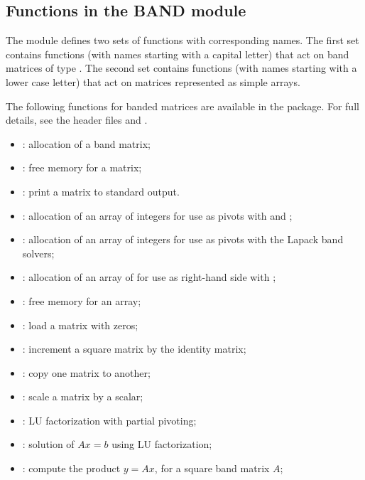 \subsection{Functions in the BAND module}\label{ss:band}

The {\band} module defines two sets of functions with corresponding names.
The first set contains functions (with names starting with a capital letter)
that act on band matrices of type .  The second set contains functions
(with names starting with a lower case letter) that act on matrices represented 
as simple arrays.

The following functions for  banded matrices are available
in the {\band} package.  For full details, see the header files
 and .
\begin{itemize}
\item {}: allocation of a  band matrix;
\item {}: free memory for a  matrix;
\item {}: print a  matrix to standard output.
\item {}: allocation of an array of  integers for use
  as pivots with  and ;
\item {}: allocation of an array of  integers for use
  as pivots with the Lapack band solvers;
\item {}: allocation of an array of  for use
  as right-hand side with ;
\item {}: free memory for an array;
\item {}: load a matrix with zeros;
\item {}: increment a square matrix by the identity matrix;
\item {}: copy one matrix to another;
\item {}: scale a matrix by a scalar;
\item {}: LU factorization with partial pivoting;
\item {}: solution of $Ax = b$ using LU factorization;
\item {}: compute the product $y = Ax$, for a square band matrix $A$;
\end{itemize}

